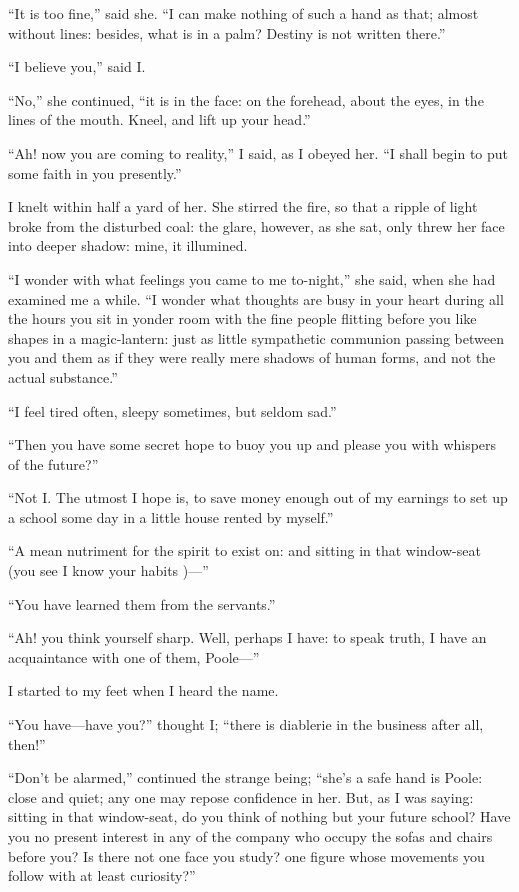 \enquote{It is too fine,} said she. \enquote{I can make nothing of such
	a hand as that; almost without lines: besides, what is in a palm?
	Destiny is not written there.}

\enquote{I believe you,} said I\@.

\enquote{No,} she continued, \enquote{it is in the face: on the
	forehead, about the eyes, in the lines of the mouth. Kneel, and lift up
	your head.}

\enquote{Ah! now you are coming to reality,} I said, as I obeyed her.
\enquote{I shall begin to put some faith in you presently.}

I knelt within half a yard of her. She stirred the fire, so that a
ripple of light broke from the disturbed coal: the glare, however, as
she sat, only threw her face into deeper shadow: mine, it illumined.

\enquote{I wonder with what feelings you came to me to-night,} she said,
when she had examined me a while. \enquote{I wonder what thoughts are
	busy in your heart during all the hours you sit in yonder room with the
	fine people flitting before you like shapes in a magic-lantern: just as
	little sympathetic communion passing between you and them as if they
	were really mere shadows of human forms, and not the actual substance.}

\enquote{I feel tired often, sleepy sometimes, but seldom sad.}

\enquote{Then you have some secret hope to buoy you up and please you
	with whispers of the future?}

\enquote{Not I\@. The utmost I hope is, to save money enough out of my
	earnings to set up a school some day in a little house rented by
	myself.}

\enquote{A mean nutriment for the spirit to exist on: and sitting in
	that window-seat (you see I know your habits )---}

\enquote{You have learned them from the servants.}

\enquote{Ah! you think yourself sharp. Well, perhaps I have: to speak
	truth, I have an acquaintance with one of them, \Mrs{} Poole---}

I started to my feet when I heard the name.

\enquote{You have---have you?} thought I; \enquote{there is diablerie in
	the business after all, then!}

\enquote{Don't be alarmed,} continued the strange being; \enquote{she's
	a safe hand is \Mrs{} Poole: close and quiet; any one may repose
	confidence in her. But, as I was saying: sitting in that window-seat,
	do you think of nothing but your future school? Have you no present
	interest in any of the company who occupy the sofas and chairs before
	you? Is there not one face you study? one figure whose movements you
	follow with at least curiosity?}

